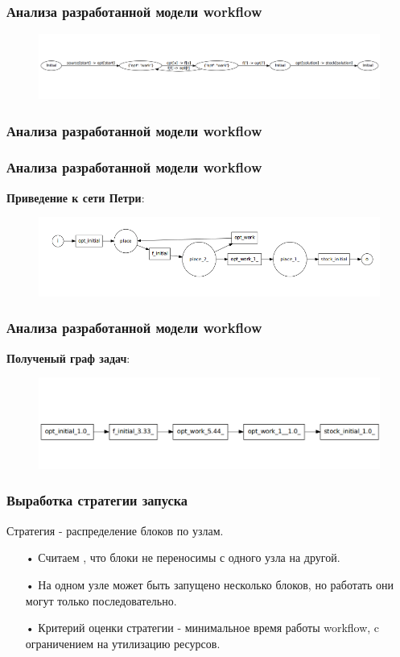 \documentclass[10pt,pdf,hyperref={unicode}]{beamer}
\begin{document}
\begin{frame}
\frametitle{Анализа разработанной модели workflow}
\begin{figure}[here]
    \centering
    \includegraphics[width=\textwidth]{optimization_state_graph.png} 
    \label{img:opt_wf}
\end{figure}
\end{frame}

\begin{frame}
\frametitle{Анализа разработанной модели workflow}
\end{frame}
\begin{frame}
\frametitle{Анализа разработанной модели workflow}
\textbf{Приведение к сети Петри}:
\begin{figure}[here]
    \centering
    \includegraphics[width=\textwidth]{optimization_petri_net.png} 
    \label{img:opt_wf}
\end{figure}
\end{frame}


\begin{frame}
\frametitle{Анализа разработанной модели workflow}
\textbf{Полученый граф задач}:
\begin{figure}[here]
    \centering
    \includegraphics[width=\textwidth]{task_graph.png} 
    \label{img:opt_wf}
\end{figure}
\end{frame}

\begin{frame}
\frametitle{Выработка стратегии запуска}

Стратегия - распределение блоков по узлам.
\begin{enumerate}
\item[•] Считаем , что блоки не переносимы с одного узла на другой.
\item[•] На одном узле может быть запущено несколько блоков, но работать они могут только последовательно.
\item[•] Критерий оценки стратегии - минимальное время работы workflow, c ограничением на утилизацию ресурсов.
\end{enumerate}
\end{frame}
\end{document}
